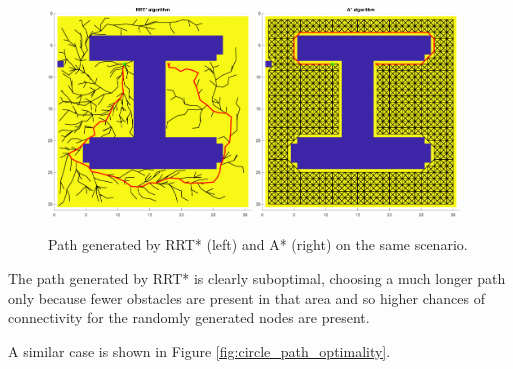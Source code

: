 \begin{figure}[H]
    \centering
    \includegraphics[width=0.48\textwidth]{./img/MATLAB/optimality/04_rrt_star_path_optimality.pdf}
    \includegraphics[width=0.48\textwidth]{./img/MATLAB/optimality/04_a_star_path_optimality.pdf}
    \caption{Path generated by RRT* (left) and A* (right) on the same scenario.}
    \label{fig:04_path_optimality}
\end{figure}

The path generated by RRT* is clearly suboptimal, choosing a much longer path only because fewer obstacles are present in that area and so higher chances of connectivity for the randomly generated nodes are present.

A similar case is shown in Figure \ref{fig:circle_path_optimality}.

